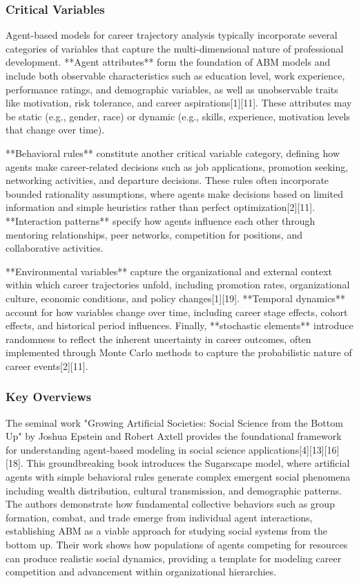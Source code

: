 \documentclass[main.tex]{subfiles}
\begin{document}
\subsubsection{Critical Variables}

Agent-based models for career trajectory analysis typically incorporate several categories of variables that capture the multi-dimensional nature of professional development. **Agent attributes** form the foundation of ABM models and include both observable characteristics such as education level, work experience, performance ratings, and demographic variables, as well as unobservable traits like motivation, risk tolerance, and career aspirations[1][11]. These attributes may be static (e.g., gender, race) or dynamic (e.g., skills, experience, motivation levels that change over time).

**Behavioral rules** constitute another critical variable category, defining how agents make career-related decisions such as job applications, promotion seeking, networking activities, and departure decisions. These rules often incorporate bounded rationality assumptions, where agents make decisions based on limited information and simple heuristics rather than perfect optimization[2][11]. **Interaction patterns** specify how agents influence each other through mentoring relationships, peer networks, competition for positions, and collaborative activities.

**Environmental variables** capture the organizational and external context within which career trajectories unfold, including promotion rates, organizational culture, economic conditions, and policy changes[1][19]. **Temporal dynamics** account for how variables change over time, including career stage effects, cohort effects, and historical period influences. Finally, **stochastic elements** introduce randomness to reflect the inherent uncertainty in career outcomes, often implemented through Monte Carlo methods to capture the probabilistic nature of career events[2][11].

\subsubsection{Key Overviews}

The seminal work "Growing Artificial Societies: Social Science from the Bottom Up" by Joshua Epstein and Robert Axtell provides the foundational framework for understanding agent-based modeling in social science applications[4][13][16][18]. This groundbreaking book introduces the Sugarscape model, where artificial agents with simple behavioral rules generate complex emergent social phenomena including wealth distribution, cultural transmission, and demographic patterns. The authors demonstrate how fundamental collective behaviors such as group formation, combat, and trade emerge from individual agent interactions, establishing ABM as a viable approach for studying social systems from the bottom up. Their work shows how populations of agents competing for resources can produce realistic social dynamics, providing a template for modeling career competition and advancement within organizational hierarchies.
\end{document}
